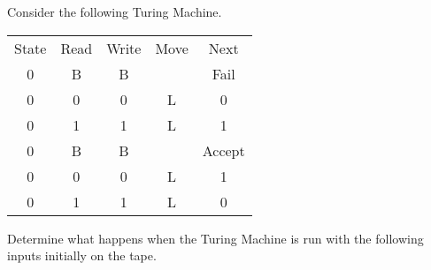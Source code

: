 

\begin{questions}

\question
Consider the following Turing Machine.
\begin{table}[H]
  \centering
  \begin{tabular}{ccccc}
	State & Read & Write & Move & Next \\
	0 & B & B &  & Fail \\
	0 & 0 & 0 & L & 0 \\
	0 & 1 & 1 & L & 1 \\

	0 & B & B &  & Accept \\
	0 & 0 & 0 & L & 1 \\
	0 & 1 & 1 & L & 0 \\
  \end{tabular}
\end{table}
Determine what happens when the Turing Machine is run with the following inputs initially on the tape.


\begin{solution}
\end{solution}



\end{questions}
